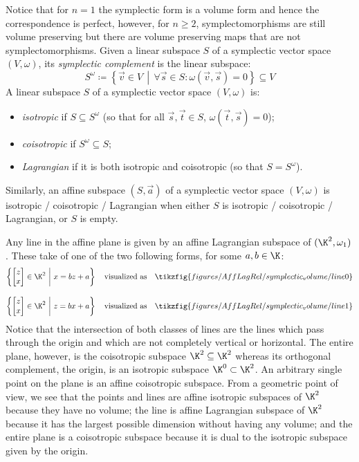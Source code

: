 Notice that for $n=1$ the symplectic form is a volume form and hence the correspondence is perfect, however, for $n\geq 2$, symplectomorphisms are still volume preserving but there are volume preserving maps that are not symplectomorphisms.
Given a linear subspace \(S\) of a symplectic vector space \((V,\omega)\), its \emph{symplectic
complement} is the linear subspace: 
\[S^\omega \coloneqq \left\{\vec v \in V \,\middle|\,  \forall \vec s \in S: \omega(\vec v,\vec s)
= 0\right\}\subseteq V\]
A linear subspace \(S\) of a symplectic vector space \((V,\omega)\) is:
\begin{itemize}
  \item  \emph{isotropic} if \(S \subseteq S^\omega\) (so that for all \(\vec s, \vec t \in S\), \(\omega(\vec{t}, \vec{s})= 0\));
  \item  \emph{coisotropic} if \(S^\omega \subseteq S\);
  \item  \emph{Lagrangian} if it is both isotropic and coisotropic (so that \(S = S^\omega\)).
\end{itemize}
Similarly, an affine subspace \((S,\vec a)\) of  a symplectic vector space \((V,\omega)\) is isotropic / coisotropic / Lagrangian when either \(S\) is isotropic / coisotropic / Lagrangian, or \(S\) is empty.
\begin{example}
  Any line in the affine plane is given by an affine Lagrangian subspace of \((\K^2,\omega_1)\).  These take of one of the two following forms, for some \(a,b\in \K\):
  \[
    \left\{\begin{bmatrix}z\\x\end{bmatrix} \in \K^2\ \middle| \ x=bz+a \right\} 
    \quad\text{visualized as}\quad
    \tikzfig{figures/AffLagRel/symplectic_volume/line0}
  \]
  
  \[
    \left\{ \begin{bmatrix}z\\x\end{bmatrix} \in \K^2\ \middle| \ z=bx+a \right\} 
    \quad\text{visualized as}\quad
    \tikzfig{figures/AffLagRel/symplectic_volume/line1}
  \]
  Notice that the intersection of both classes of lines are the lines which pass through the origin and which are not completely vertical or horizontal.
  The entire plane, however, is the coisotropic subspace 
  \(\K^2 \subseteq \K^2\)
  whereas its orthogonal complement, the origin, is an isotropic  subspace
  \(\K^0 \subset \K^2\).  An arbitrary single point on the plane is an affine coisotropic subspace.
  From a geometric point of view, we see that the points and lines are affine isotropic subspaces of  \(\K^2\) because they have no volume; the line is affine Lagrangian subspace of \(\K^2\) because it has the largest possible dimension without having any volume; and the entire plane is a coisotropic subspace because it is dual to the isotropic subspace given by the origin.
\end{example}
